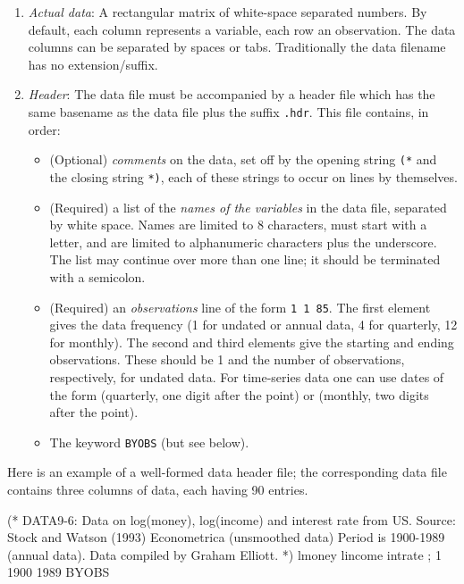 \begin{enumerate}
\item \emph{Actual data}: A rectangular matrix of white-space
  separated numbers. By default, each column represents a variable,
  each row an observation. The data columns can be separated by spaces
  or tabs. Traditionally the data filename has no extension/suffix.
\item \emph{Header}: The data file must be accompanied by a header
  file which has the same basename as the data file plus the suffix
  \verb+.hdr+.  This file contains, in order:
  \begin{itemize}
  \item (Optional) \emph{comments} on the data, set off by the opening
    string \verb+(*+ and the closing string \verb+*)+, each of these
    strings to occur on lines by themselves.
  \item (Required) a list of the \emph{names of the variables} in the
    data file, separated by white space. Names are limited to 8
    characters, must start with a letter, and are limited to
    alphanumeric characters plus the underscore.  The list may
    continue over more than one line; it should be terminated with a
    semicolon.
  \item (Required) an \emph{observations} line of the form
    \verb+1 1 85+.  The first element gives the data frequency (1 for
    undated or annual data, 4 for quarterly, 12 for monthly).  The
    second and third elements give the starting and ending
    observations.  These should be 1 and the number of observations,
    respectively, for undated data.  For time-series data one can use
    dates of the form  (quarterly, one digit after the
    point) or  (monthly, two digits after the point).
  \item The keyword \verb+BYOBS+ (but see below).
  \end{itemize}
\end{enumerate}

Here is an example of a well-formed data header file; the
corresponding data file contains three columns of data, each having 90
entries.

\begin{code} 
(* 
  DATA9-6: 
  Data on log(money), log(income) and interest rate from US. 
  Source: Stock and Watson (1993) Econometrica 
  (unsmoothed data) Period is 1900-1989 (annual data). 
  Data compiled by Graham Elliott. 
*) 
lmoney lincome intrate ; 
1 1900 1989 BYOBS
\end{code}

